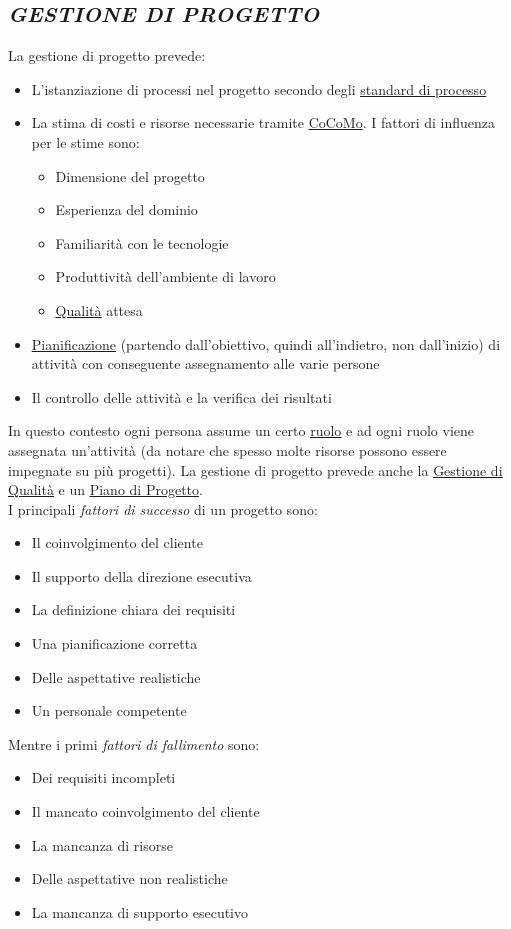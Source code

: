 		\subsection{\emph{GESTIONE DI PROGETTO}}  \label{gestioneprogetto}	%
		La gestione di progetto prevede:
			\begin{itemize}
				\item L'istanziazione di processi nel progetto secondo degli \underline{\hyperref[standard]{standard di processo}}
				\item La stima di costi e risorse necessarie tramite \underline{\hyperref[cocomo]{CoCoMo}}. I fattori di influenza per le stime sono:
				\begin{itemize}
					\item Dimensione del progetto
					\item Esperienza del dominio
					\item Familiarità con le tecnologie
					\item Produttività dell'ambiente di lavoro
					\item \underline{\hyperref[qualita]{Qualità}} attesa
				\end{itemize}
				\item \underline{\hyperref[pianificazione]{Pianificazione}} (partendo dall'obiettivo, quindi all'indietro, non dall'inizio) di attività con conseguente assegnamento alle varie persone
				\item Il controllo delle attività e la verifica dei risultati
			\end{itemize}
		In questo contesto ogni persona assume un certo \underline{\hyperref[ruoli]{ruolo}} e ad ogni ruolo viene assegnata un'attività (da notare che spesso molte risorse possono essere impegnate su più progetti). La gestione di progetto prevede anche la  \underline{\hyperref[gestionequalita]{Gestione di Qualità}} e un \underline{\hyperref[piano]{Piano di Progetto}}. \\
		I principali \textit{fattori di successo} di un progetto sono:
		\begin{itemize}
			\item Il coinvolgimento del cliente
			\item Il supporto della direzione esecutiva
			\item La definizione chiara dei requisiti
			\item Una pianificazione corretta
			\item Delle aspettative realistiche
			\item Un personale competente
		\end{itemize}
		Mentre i primi \textit{fattori di fallimento} sono:
		\begin{itemize}
			\item Dei requisiti incompleti
			\item Il mancato coinvolgimento del cliente
			\item La mancanza di risorse
			\item Delle aspettative non realistiche
			\item La mancanza di supporto  esecutivo
		\end{itemize}

